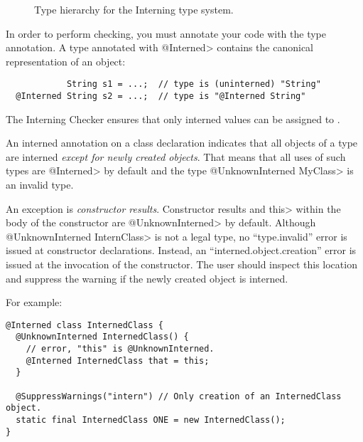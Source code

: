 
\begin{figure}
\caption{Type hierarchy for the Interning type system.}
\label{fig-interning-hierarchy}
\end{figure}

In order to perform checking, you must annotate your code with the 
type annotation.  A type annotated with \<@Interned> contains the canonical
representation of an
object:

\begin{smaller}
\begin{Verbatim}
            String s1 = ...;  // type is (uninterned) "String"
  @Interned String s2 = ...;  // type is "@Interned String"
\end{Verbatim}
\end{smaller}

The Interning Checker ensures that only interned
values can be assigned to .


An interned annotation on a class declaration indicates that all objects of a
type are interned \textit{except for newly created objects}. That means that
all uses of such types are \<@Interned> by default and the type \<@UnknownInterned
MyClass> is an invalid type.

An exception is \textit{constructor results}. Constructor results and \<this> within the
body of the constructor are \<@UnknownInterned> by default. Although \<@UnknownInterned InternClass>
is not a legal type, no ``type.invalid'' error is issued at constructor declarations.
Instead, an ``interned.object.creation''
error is issued at the invocation of the constructor. The user should inspect
this location and suppress the warning if the newly created object is interned.

For example:

\begin{Verbatim}
@Interned class InternedClass {
  @UnknownInterned InternedClass() {
    // error, "this" is @UnknownInterned.
    @Interned InternedClass that = this;
  }

  @SuppressWarnings("intern") // Only creation of an InternedClass object.
  static final InternedClass ONE = new InternedClass();
}
\end{Verbatim}

